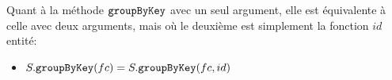 \bigskip


Quant \`a la m\'ethode ${\tt groupByKey}$ avec un seul argument, elle est
\'equivalente \`a celle avec deux arguments, mais o\`u le deuxi\`eme est simplement la fonction $id$entit\'e:
%
\begin{itemize}
\item $S.{\tt groupByKey}(fc) = S.{\tt groupByKey}(fc, id)$
\end{itemize}



